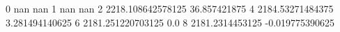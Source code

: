 0 nan nan
1 nan nan
2 2218.108642578125 36.857421875
4 2184.53271484375 3.281494140625
6 2181.251220703125 0.0
8 2181.2314453125 -0.019775390625

